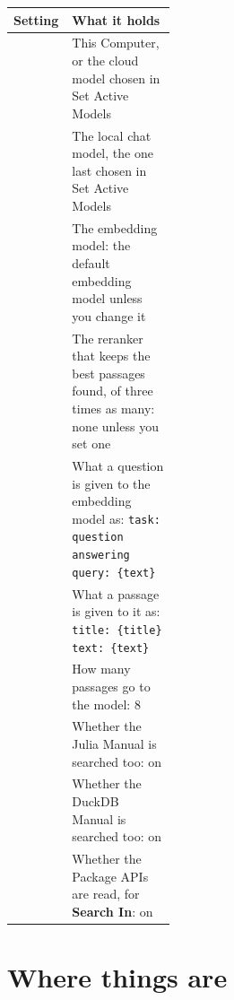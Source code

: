 \begin{center}\small
\renewcommand{\arraystretch}{1.25}
\begin{tabularx}{\linewidth}{@{}p{0.36\linewidth}L@{}}
\toprule
\textbf{Setting} & \textbf{What it holds}\\
\midrule
{} & This Computer, or the cloud model chosen in Set Active Models\\
 & The local chat model, the one last chosen in Set Active Models\\
 & The embedding model: the default embedding model unless you change it\\
 & The reranker that keeps the best passages found, of three times as many: none unless you set one\\
 & What a question is given to the embedding model as: \texttt{\small task: question answering \textbar{} query: \{text\}}\\
 & What a passage is given to it as: \texttt{\small title: \{title\} \textbar{} text: \{text\}}\\
 & How many passages go to the model: 8\\
 & Whether the Julia Manual is searched too: on\\
 & Whether the DuckDB Manual is searched too: on\\
 & Whether the Package APIs are read, for \textbf{Search In}: on\\
\bottomrule
\end{tabularx}
\end{center}

\section{Where things are}\label{sec:where}

